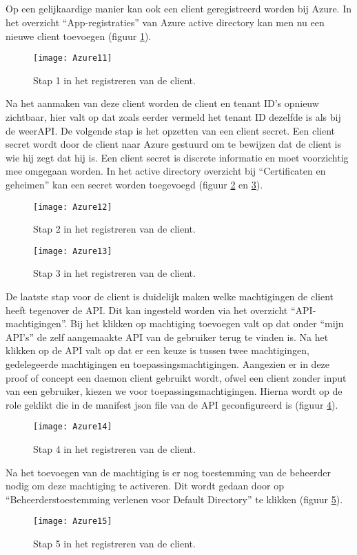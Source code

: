 \subsection{}
Op een gelijkaardige manier kan ook een client geregistreerd worden bij Azure. In het overzicht “App-registraties” van Azure active directory kan men nu een nieuwe client toevoegen (figuur \ref{fig:azure11}).
\begin{figure}[H]
	\centering
	\texttt{[image: Azure11]} 
	\caption[Azure11]{Stap 1 in het registreren van de client.}
	\label{fig:azure11}
\end{figure}
Na het aanmaken van deze client worden de client en tenant ID’s opnieuw zichtbaar, hier valt op dat zoals eerder vermeld het tenant ID dezelfde is als bij de weerAPI. De volgende stap is het opzetten van een client secret. Een client secret wordt door de client naar Azure gestuurd om te bewijzen dat de client is wie hij zegt dat hij is. Een client secret is discrete informatie en moet voorzichtig mee omgegaan worden. In het active directory overzicht bij “Certificaten en geheimen” kan een secret worden toegevoegd (figuur \ref{fig:azure12} en \ref{fig:azure13}). 
\begin{figure}[H]
	\centering
	\texttt{[image: Azure12]} 
	\caption[Azure12]{Stap 2 in het registreren van de client.}
	\label{fig:azure12}
\end{figure}
\begin{figure}[H]
	\centering
	\texttt{[image: Azure13]} 
	\caption[Azure13]{Stap 3 in het registreren van de client.}
	\label{fig:azure13}
\end{figure}
De laatste stap voor de client is duidelijk maken welke machtigingen de client heeft tegenover de API. Dit kan ingesteld worden via het overzicht “API-machtigingen”. Bij het klikken op machtiging toevoegen valt op dat onder “mijn API’s” de zelf aangemaakte API van de gebruiker terug te vinden is. Na het klikken op de API valt op dat er een keuze is tussen twee machtigingen, gedelegeerde machtigingen en toepassingsmachtigingen. Aangezien er in deze proof of concept een daemon client gebruikt wordt, ofwel een client zonder input van een gebruiker, kiezen we voor toepassingsmachtigingen. Hierna wordt op de role geklikt die in de manifest json file van de API geconfigureerd is (figuur \ref{fig:azure14}). 
\begin{figure}[H]
	\centering
	\texttt{[image: Azure14]} 
	\caption[Azure14]{Stap 4 in het registreren van de client.}
	\label{fig:azure14}
\end{figure}
Na het toevoegen van de machtiging is er nog toestemming van de beheerder nodig om deze machtiging te activeren. Dit wordt gedaan door op “Beheerderstoestemming verlenen voor Default Directory” te klikken (figuur \ref{fig:azure15}).
\begin{figure}[H]
	\centering
	\texttt{[image: Azure15]} 
	\caption[Azure15]{Stap 5 in het registreren van de client.}
	\label{fig:azure15}
\end{figure}
